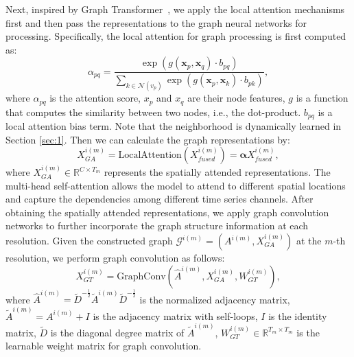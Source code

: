 



Next, inspired by Graph Transformer~\cite{gt_survey}, we apply the local attention mechanisms first and then pass the representations to the graph neural networks for processing. Specifically,
the local attention for graph processing is first computed as:
\begin{equation}
    \alpha_{pq} = \frac{\exp(g(\mathbf{x}_p, \mathbf{x}_q) \cdot b_{pq})}{\sum_{k \in \mathcal{N}(v_p)}\exp(g(\mathbf{x}_p, \mathbf{x}_k) \cdot b_{pk})},
\end{equation}
where $\alpha_{pq}$ is the attention score, $x_p$ and $x_q$ are their node features, $g$ is a function that computes the similarity between two nodes, i.e., the dot-product. $b_{pq}$ is a local attention bias term. Note that the neighborhood is dynamically learned in Section \ref{sec:1}. Then we can calculate the graph representations by:
\begin{equation}
{X}^{i(m)}_{GA} = \text{LocalAttention}({X}^{i(m)}_{fused}) = \mathbf{\alpha} {X}^{i(m)}_{fused},
\end{equation}
where ${X}^{i(m)}_{GA} \in \mathbb{R}^{C \times T_m}$ represents the spatially attended representations. The multi-head self-attention allows the model to attend to different spatial locations and capture the dependencies among different time series channels.
After obtaining the spatially attended representations, we apply graph convolution networks to further incorporate the graph structure information at each resolution. Given the constructed graph $\mathcal{G}^{i(m)} = ({A}^{i(m)}, {X}^{i(m)}_{GA})$ at the $m$-th resolution, we perform graph convolution as follows:
\begin{equation}
{X}^{i(m)}_{GT} = \text{GraphConv}(\hat{{A}}^{i(m)},  {X}^{i(m)}_{GA}, {W}^{i(m)}_{GT}),
\end{equation}
where $\hat{{A}}^{i(m)} = \tilde{{D}}^{-\frac{1}{2}} \tilde{{A}}^{i(m)} \tilde{{D}}^{-\frac{1}{2}}$ is the normalized adjacency matrix, $\tilde{{A}}^{i(m)} = {A}^{i(m)} + {I}$ is the adjacency matrix with self-loops, ${I}$ is the identity matrix, $\tilde{{D}}$ is the diagonal degree matrix of $\tilde{{A}}^{i(m)}$, ${W}^{i(m)}_{GT} \in \mathbb{R}^{T_m \times T_m}$ is the learnable weight matrix for graph convolution.
